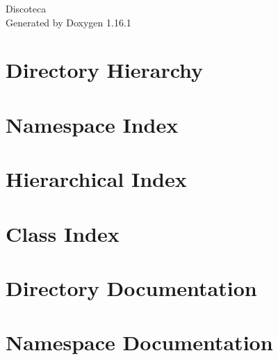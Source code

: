 \documentclass[twoside]{book}
\newcommand{\+}{\discretionary{\mbox{\scriptsize$\hookleftarrow$}}{}{}}
\newcommand{\clearemptydoublepage}{%
    \newpage{\pagestyle{empty}\cleardoublepage}%
  }
\begin{document}
  \raggedbottom
    \hypersetup{pageanchor=false,
                bookmarksnumbered=true,
                pdfencoding=unicode
               }
  \begin{titlepage}
  \vspace*{7cm}
  \begin{center}%
  {\Large Discoteca}\\
  \vspace*{1cm}
  {\large Generated by Doxygen 1.16.1}\\
  \end{center}
  \end{titlepage}
  \clearemptydoublepage
  \tableofcontents
  \clearemptydoublepage
  \hypersetup{pageanchor=true}



\chapter{Directory Hierarchy}

\chapter{Namespace Index}

\chapter{Hierarchical Index}

\chapter{Class Index}

\chapter{Directory Documentation}


\chapter{Namespace Documentation}








\end{document}
